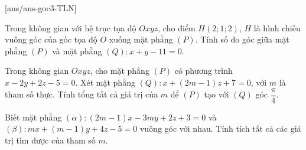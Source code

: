
[ans/ans-goc3-TLN]
\TNSA
\begin{ex}%
	Trong không gian với hệ trục tọa độ $Oxyz$, cho điểm $H(2;1;2)$, $H$ là hình chiếu vuông góc của gốc tọa độ $O$ xuống mặt phẳng $(P)$. Tính số đo góc giữa mặt phẳng $(P)$ và mặt phẳng $(Q)\colon x+y-11=0$.
\end{ex}
\begin{ex}%
	Trong không gian $O x y z$, cho mặt phẳng $(P)$ có phương trình $x-2 y+2 z-5=0$. Xét mặt phẳng $(Q): x+(2 m-1) z+7=0$, với $m$ là tham số thực. Tính tổng tất cả giá trị của $m$ để $(P)$ tạo với $(Q)$ góc $\dfrac{\pi}{4}$.
\end{ex}

\begin{ex}%
	Biết mặt phẳng $(\alpha):(2m-1)x-3my+2z+3=0$ và $(\beta): mx+(m-1)y+4z-5=0$ vuông góc với nhau. Tính tích tất cả các giá trị tìm được của tham số $m$.
\end{ex}
